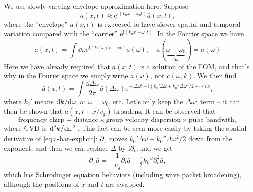 \documentclass[hyperref, a4paper]{article}
\newcommand*{\ii}{\mathrm{i}}
\newcommand*{\ee}{\mathrm{e}}
\begin{document}
We use slowly varying envelope approximation here.
Suppose 
\begin{equation}
    a(x, t) \approx \ee^{\ii (k_0 x - \omega_0 t)} \bar{a}(x, t),
\end{equation}
where the ``envelope'' $\bar{a}(x, t)$ is expected to have slower spatial and temporal variation 
compared with the ``carrier'' $\ee^{\ii (k_0 x - \omega_0 t)}$.
In the Fourier space we have 
\begin{equation}
    a(x, t) = \int \dd{\omega} \ee^{\ii (k(\omega) x - \omega t)} a(\omega), 
    \quad \bar{a}(\underbrace{\omega - \omega_0}_{\Delta \omega}) = a(\omega)
\end{equation}
Here we have already required that $a(x, t)$ is a solution of the EOM, 
and that's why in the Fourier space we simply write $a(\omega)$, not $a(\omega, k)$.
We then find 
\begin{equation}
    \bar{a}(x, t) = \int \frac{\dd{\Delta \omega}}{2\pi} \bar{a}(\Delta \omega)
    \ee^{
        - \ii \Delta \omega t + \ii (k_0' \Delta \omega + k_0'' \Delta \omega^2 / 2 + \cdots) x
    },
    \label{eq:a-bar-explicit}
\end{equation}
where $k_0'$ means $\dv*{k}{\omega}$ at $\omega = \omega_0$, etc.
Let's only keep the $\Delta \omega^2$ term -- 
it can then be shown that $\bar{a}(x , t + x / v_{\text{g}})$ broadens.
It can be observed that 
\begin{equation}
    \text{frequency chirp} = \text{distance} \times \text{group velocity dispersion} \times \text{pulse bandwith},
\end{equation}
where GVD is $\dv*[2]{k}{\omega}$.
This fact can be seen more easily by taking the spatial derivative of \eqref{eq:a-bar-explicit}:
$\partial_x$ moves $k_0' \Delta \omega + k_0'' \Delta \omega^2 / 2$ down from the exponent, 
and then we can replace $\Delta$ by $\ii \partial_t$, and we get 
\begin{equation}
    \partial_x \bar{a} = - \frac{1}{v_{\text{g}}} \partial_t \bar{a} 
    - \frac{\ii}{2} k_0'' \partial_t^2 \bar{a},
    \label{eq:envelope-eom}
\end{equation}
which has Schrodinger equation behaviors (including wave packet broadening), 
although the positions of $x$ and $t$ are swapped.
\end{document}
